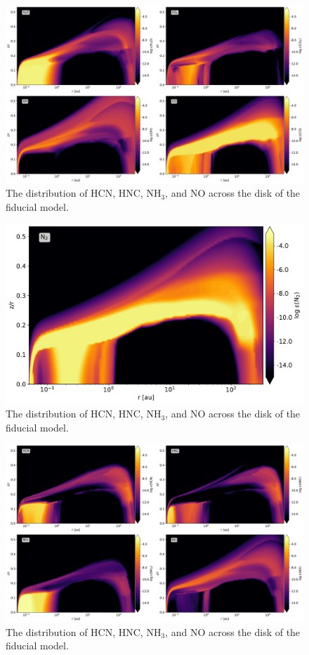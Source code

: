 \documentclass[oneside, single, authoryear, semicolon]{lion-msc}
\newcommand{\4}{$_4$}
\newcommand{\3}{$_3$}
\newcommand{\2}{$_2$}
\begin{document}
\begin{figure}[!ht]
    \centering
    \includegraphics[width=\linewidth]{Figures/Abundance1.pdf}
    \caption{The distribution of HCN, HNC, NH\3, and NO across the disk of the fiducial model.}
    \label{fig: nitrogen distribution}
\end{figure}

\begin{figure}[!ht]
    \centering
    \includegraphics[width=\linewidth]{Figures/AbundanceN2.pdf}
    \caption{The distribution of HCN, HNC, NH\3, and NO across the disk of the fiducial model.}
    \label{fig: nitrogen distribution}
\end{figure}

\begin{figure}[!ht]
    \centering
    \includegraphics[width=\linewidth]{Figures/Abundance2.pdf}
    \caption{The distribution of HCN, HNC, NH\3, and NO across the disk of the fiducial model.}
    \label{fig: nitrogen distribution}
\end{figure}
\end{document}
